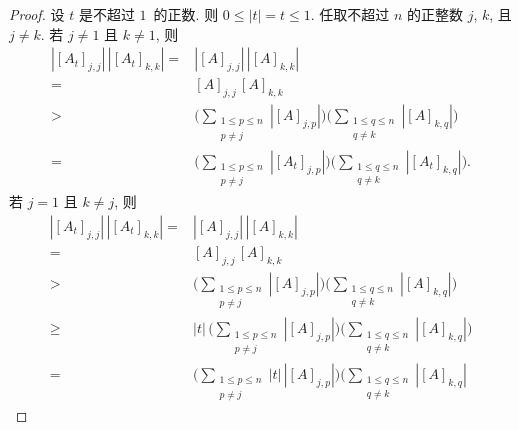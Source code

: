 \documentclass[../libro.tex]{subfiles}
\begin{document}
\begin{proof}
    设 \(t\) 是不超过 \(1\)~的正数.
    则 \(0 \leq |t| = t \leq 1\).
    任取不超过 \(n\) 的正整数 \(j\), \(k\),
    且 \(j \neq k\).
    若 \(j \neq 1\) 且 \(k \neq 1\), 则
    \begin{align*}
        |[A_t]_{j,j}|\,|[A_t]_{k,k}|
        = {} &
        |[A]_{j,j}|\,|[A]_{k,k}|
        \\
        = {} &
        [A]_{j,j}\,[A]_{k,k}
        \\
        > {} &
        \Bigg(
            \sum_{\substack{1 \leq p \leq n \\
            p \neq j}} {|[A]_{j,p}|}
        \Bigg)
        \Bigg(
            \sum_{\substack{1 \leq q \leq n \\
            q \neq k}} {|[A]_{k,q}|}
        \Bigg)
        \\
        = {} &
        \Bigg(
            \sum_{\substack{1 \leq p \leq n \\
            p \neq j}} {|[A_t]_{j,p}|}
        \Bigg)
        \Bigg(
            \sum_{\substack{1 \leq q \leq n \\
            q \neq k}} {|[A_t]_{k,q}|}
        \Bigg).
    \end{align*}
    若 \(j = 1\) 且 \(k \neq j\), 则
    \begin{align*}
        |[A_t]_{j,j}|\,|[A_t]_{k,k}|
        = {} &
        |[A]_{j,j}|\,|[A]_{k,k}|
        \\
        = {} &
        [A]_{j,j}\,[A]_{k,k}
        \\
        > {} &
        \Bigg(
            \sum_{\substack{1 \leq p \leq n \\
            p \neq j}} {|[A]_{j,p}|}
        \Bigg)
        \Bigg(
            \sum_{\substack{1 \leq q \leq n \\
            q \neq k}} {|[A]_{k,q}|}
        \Bigg)
        \\
        \geq {} &
        |t|\,\Bigg(
            \sum_{\substack{1 \leq p \leq n \\
            p \neq j}} {|[A]_{j,p}|}
        \Bigg)
        \Bigg(
            \sum_{\substack{1 \leq q \leq n \\
            q \neq k}} {|[A]_{k,q}|}
        \Bigg)
        \\
        = {} &
        \Bigg(
            \sum_{\substack{1 \leq p \leq n \\
            p \neq j}} {|t|\,|[A]_{j,p}|}
        \Bigg)
        \Bigg(
            \sum_{\substack{1 \leq q \leq n \\
            q \neq k}} {|[A]_{k,q}|}

\end{align*}
\end{proof}
\end{document}
